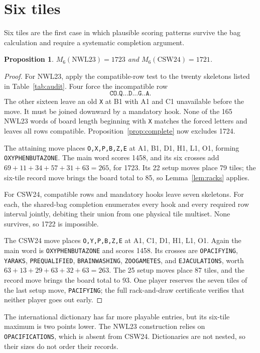 \documentclass{article}
\theoremstyle{plain}
\newtheorem{proposition}[theorem]{Proposition}
\newcommand{\word}[1]{\texttt{#1}}
\begin{document}
\section{Six tiles}

Six tiles are the first case in which plausible scoring patterns survive the
bag calculation and require a systematic completion argument.

\begin{proposition}\label{prop:six}
$M_6(\mathrm{NWL23})=1723$ and $M_6(\mathrm{CSW24})=1721$.
\end{proposition}
\begin{proof}
For NWL23, apply the compatible-row test to the twenty skeletons listed in
Table~\ref{tab:audit}. Four force the incompatible row
\[
 \word{CO.Q...D...G..A}.
\]
The other sixteen leave an old \word{X} at B1 with A1 and C1 unavailable
before the move. It must be joined downward by a mandatory hook. None of the
165 NWL23 words of board length beginning with \word{X} matches the forced
letters and leaves all rows compatible. Proposition~\ref{prop:complete} now
excludes 1724.

The attaining move places \word{O,X,P,B,Z,E} at A1, B1, D1, H1, L1, O1,
forming \word{OXYPHENBUTAZONE}. The main word scores 1458, and its six crosses
add $69+11+34+57+31+63=265$, for 1723. Its 22 setup moves place 79 tiles;
the six-tile record move brings the board total
to 85, so Lemma~\ref{lem:racks} applies.

For CSW24, compatible rows and mandatory hooks leave seven skeletons. For each,
the shared-bag completion enumerates every hook and every required row interval
jointly, debiting their union from one physical tile multiset. None survives,
so 1722 is impossible.

The CSW24 move places \word{O,Y,P,B,Z,E} at A1, C1, D1, H1, L1, O1. Again the
main word is \word{OXYPHENBUTAZONE} and scores 1458. Its crosses are
\word{OPACIFYING}, \word{YARAKS}, \word{PREQUALIFIED},
\word{BRAINWASHING}, \word{ZOOGAMETES}, and \word{EJACULATIONS}, worth
$63+13+29+63+32+63=263$. The 25 setup moves place 87 tiles, and the record
move brings the board total to 93. One
player reserves the seven tiles of the last setup move, \word{PACIFYING}; the
full rack-and-draw certificate verifies that neither player goes out early.
\end{proof}

The international dictionary has far more playable entries, but its six-tile
maximum is two points lower. The NWL23 construction relies on
\word{OPACIFICATIONS}, which is absent from CSW24. Dictionaries are not nested,
so their sizes do not order their records.
\end{document}
